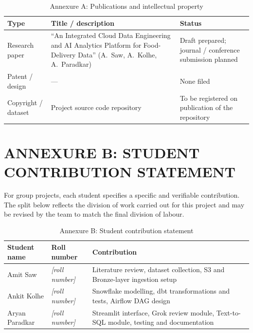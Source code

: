 \documentclass[12pt,a4paper]{report}
\newcommand{\ph}[1]{\textit{[#1]}}
\begin{document}
\begin{table}[htbp]
\centering
\caption{Annexure A: Publications and intellectual property}
\small
\begin{tabular}{@{}p{2.6cm}p{7.2cm}p{2.8cm}@{}}
\toprule
\textbf{Type} & \textbf{Title / description} & \textbf{Status} \\
\midrule
Research paper & ``An Integrated Cloud Data Engineering and AI Analytics Platform for Food-Delivery Data'' (A.\ Saw, A.\ Kolhe, A.\ Paradkar) & Draft prepared; journal / conference submission planned \\
Patent / design & --- & None filed \\
Copyright / dataset & Project source code repository & To be registered on publication of the repository \\
\bottomrule
\end{tabular}
\end{table}

\clearpage
\chapter*{ANNEXURE B: STUDENT CONTRIBUTION STATEMENT}

\noindent For group projects, each student specifies a specific and verifiable contribution. The split below reflects the division of work carried out for this project and may be revised by the team to match the final division of labour.

\begin{table}[htbp]
\centering
\caption{Annexure B: Student contribution statement}
\small
\begin{tabular}{@{}p{3.0cm}p{3.2cm}p{6.4cm}@{}}
\toprule
\textbf{Student name} & \textbf{Roll number} & \textbf{Contribution} \\
\midrule
Amit Saw & \ph{roll number} & Literature review, dataset collection, S3 and Bronze-layer ingestion setup \\
Ankit Kolhe & \ph{roll number} & Snowflake modelling, dbt transformations and tests, Airflow DAG design \\
Aryan Paradkar & \ph{roll number} & Streamlit interface, Grok review module, Text-to-SQL module, testing and documentation \\
\bottomrule
\end{tabular}
\end{table}
\end{document}
